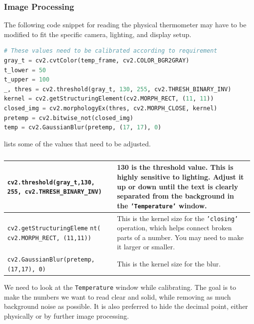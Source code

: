 \subsubsection{Image Processing}\label{image-processing}
The following code snippet  for reading the physical thermometer may have to be modified to fit the specific camera, lighting, and display setup.
\begin{lstlisting}[language=python]
# These values need to be calibrated according to requirement
gray_t = cv2.cvtColor(temp_frame, cv2.COLOR_BGR2GRAY)
t_lower = 50
t_upper = 100
_, thres = cv2.threshold(gray_t, 130, 255, cv2.THRESH_BINARY_INV)
kernel = cv2.getStructuringElement(cv2.MORPH_RECT, (11, 11))
closed_img = cv2.morphologyEx(thres, cv2.MORPH_CLOSE, kernel)
pretemp = cv2.bitwise_not(closed_img)
temp = cv2.GaussianBlur(pretemp, (17, 17), 0)
\end{lstlisting}
lists some of the values that need to be adjusted. 
\begin{table}[H]
\centering
\small
\label{table:key_variables_table}
\begin{tabularx}{\columnwidth}{|X|X|}
\hline
 \texttt{cv2.threshold(gray\_t,130, 255, cv2.THRESH\_BINARY\_INV)} & 130 is the threshold value. This is highly sensitive to lighting. Adjust it up or down until the text is clearly separated from the background in the \texttt{'Temperature'} window. \\
\hline
    \texttt{cv2.getStructuringEleme} \texttt{nt( cv2.MORPH\_RECT, (11,11))} & This is the kernel size for the \texttt{'closing'} operation, which helps connect broken parts of a number. You may need to make it larger or smaller. \\
\hline
 \texttt{cv2.GaussianBlur(pretemp, (17,17), 0)} & This is the kernel size for the blur. \\
\hline
\end{tabularx}
\caption{}
\label{tab:therm-var}
\end{table}

We need to look at the \texttt{Temperature} window while calibrating. The goal is to make the numbers we want to read clear and solid, while removing as much background noise as possible.
It is also preferred to hide the decimal point, either physically or by further image processing.


